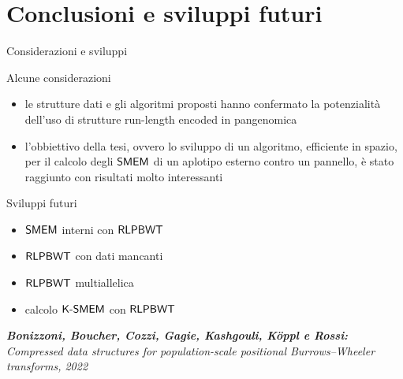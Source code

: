 \documentclass[]{beamer}
\def\KSMEM{\mbox{\rm {\sf K-SMEM}}}
\def\RLPBWT{\mbox{\rm {\sf RLPBWT}}}
\def\SMEM{\mbox{\rm {\sf SMEM}}}
\begin{document}
\section{Conclusioni e sviluppi futuri}
\begin{frame}{Considerazioni e sviluppi}
  \begin{block}{Alcune considerazioni}
    \small
    \begin{itemize}
      \item le strutture dati e gli algoritmi proposti hanno
      confermato la potenzialità dell'uso di strutture run-length encoded in
      pangenomica
      \item l'obbiettivo della tesi, ovvero lo sviluppo di un algoritmo,
      efficiente in spazio, per il calcolo degli $\SMEM$ di un aplotipo esterno
      contro un pannello, è stato raggiunto con risultati molto interessanti
    \end{itemize}
  \end{block}
  \begin{block}{Sviluppi futuri}
    \small
    \begin{multicols}{2}
      \begin{itemize}
        \item $\SMEM$ interni con $\RLPBWT$
        \item $\RLPBWT$ con dati mancanti
        \item $\RLPBWT$ multiallelica
        \item calcolo $\KSMEM$ con $\RLPBWT$
      \end{itemize}
    \end{multicols}
  \end{block}
  \pause
  \begin{alertblock}{}
    \footnotesize{\textit{\textbf{Bonizzoni, Boucher, Cozzi, Gagie, Kashgouli,
          K\"{o}ppl e Rossi:} \\Compressed data structures for population-scale
        positional Burrows--Wheeler transforms, 2022}}
  \end{alertblock}
\end{frame}
%   
%   
\end{document}
